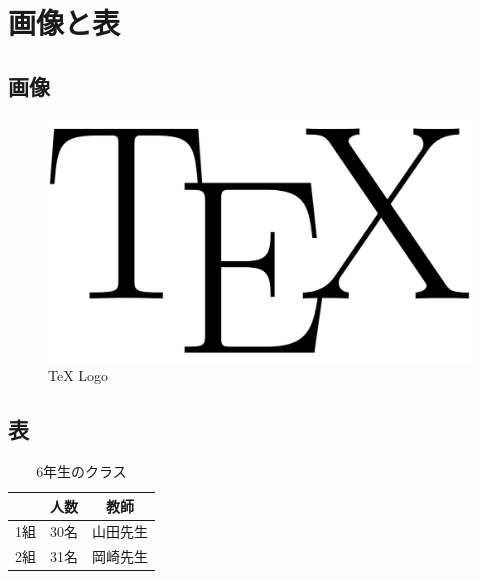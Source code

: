 \newpage
\section{画像と表}
\subsection{画像}
\begin{figure}[h]
  \centering
    \includegraphics[scale=0.2]{image/tex_logo}
    \caption{TeX Logo}
\end{figure}

\subsection{表}
\begin{table}[h]
  \centering
  \caption{6年生のクラス}
  \begin{tabular}{|c|cc|}
    \hline
    & 人数 & 教師 \\
    \hline
    1組 & 30名 & 山田先生 \\
    2組 & 31名 & 岡崎先生 \\
    \hline
  \end{tabular}
\end{table}
